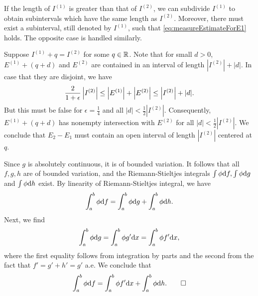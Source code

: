 \begin{exercise}{7.4}
  If the length of $I^{(1)}$ is greater than that of $I^{(2)}$,
  we can subdivide $I^{(1)}$ to obtain
  subintervals which have the same length as $I^{(2)}$.
  Moreover,
  there must exist a subinterval, still denoted by $I^{(1)}$,
  such that \eqref{eq:measureEstimateForE1} holds.
  The opposite case is handled similarly.

  Suppose $I^{(1)} + q = I^{(2)}$ for some $q \in \mathbb{R}$.
  Note that for small $d > 0$,
  $E^{(1)} + (q+d)$ and $E^{(2)}$ are contained in
  an interval of length $|I^{(2)}| + |d|$.
  In case that they are disjoint, we have
  \[
    \frac{2}{1 + \epsilon} \left\vert I^{(2)}\right\vert \le
    \left\vert E^{(1)}\right\vert + \left\vert E^{(2)}\right\vert \le \left\vert I^{(2)}\right\vert + |d|.
  \]
  But this must be false for $\epsilon = \frac{1}{4}$
  and all $|d| < \frac{1}{2} |I^{(2)}|$.
  Consequently, $E^{(1)} + (q+d)$ has nonempty intersection with $E^{(2)}$
  for all $|d| < \frac{1}{2}|I^{(2)}|$.
  We conclude that $E_2 - E_1$ must contain an open interval
  of length $|I^{(2)}|$ centered at $q$.
\end{exercise}

\begin{exercise}{7.5}
  Since $g$ is absolutely continuous,
  it is of bounded variation.
  It follows that all $f, g, h$ are of bounded variation,
  and the Riemann-Stieltjes integrals
  $\int \phi \mathrm{d} f, \int \phi \mathrm{d} g$ and $\int \phi \mathrm{d} h$ exist.
  By linearity of Riemann-Stieltjes integral, we have
  \[
    \int_a^b \phi \mathrm{d} f = \int_a^b \phi \mathrm{d} g + \int_a^b \phi \mathrm{d} h.
  \]
  Next, we find
  \[
    \int_a^b \phi \mathrm{d} g = \int_a^b \phi g' \mathrm{d} x
    = \int_a^b \phi f' \mathrm{d} x,
  \]
  where the first equality follows from integration by parts
  and the second from the fact that $f' = g' + h' = g'$ a.e.
  We conclude that
  \[
    \int_a^b \phi \mathrm{d} f = \int_a^b \phi f' \mathrm{d} x + \int_a^b \phi \mathrm{d} h.
    \qedhere
  \]
\end{exercise}

